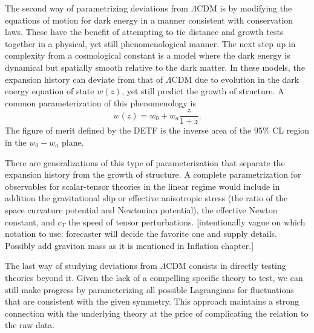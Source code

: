 The second way of parametrizing deviations from $\Lambda$CDM is by modifying the equations of motion for dark energy in a manner consistent with conservation laws.   These have the benefit of attempting to tie distance and growth
tests together in a physical, yet still phenomenological manner.    The next step up in
complexity from a cosmological constant is a model where the dark energy is dynamical
but spatially smooth relative to the dark matter.   In these models, the expansion history
can deviate from that of $\Lambda$CDM due to evolution in  the dark energy
equation of state $w(z)$, yet still predict the growth of structure.   A common parameterization
of this phenomenology is
\begin{equation}
w(z) = w_0 + w_a \frac{z}{1+z}.
\end{equation}
The figure of merit defined by the DETF is the inverse area of the
95\% CL region in the $w_0-w_a$ plane.  

There are generalizations of this type of parameterization that separate the expansion history from 
the growth of structure.   
A complete parametrization for observables for scalar-tensor theories in the linear regime would include in addition
the gravitational slip or effective anisotropic stress  (the ratio of the space curvature potential and Newtonian potential),  the effective Newton constant, and  $c_T$ the
speed of tensor perturbations. [intentionally vague on which notation to use: forecaster will
decide the favorite one and supply details.  Possibly add graviton mass as it is mentioned
in Inflation chapter.]

%
The last way of studying deviations from $\Lambda$CDM consists in directly testing theories beyond it.  Given the lack of a compelling specific theory to test, we can still make progress
by parameterizing all possible Lagrangians for fluctuations that are consistent with the
given symmetry.
 This approach maintains a strong connection with the underlying theory at the price of
complicating the relation to the raw data.  

